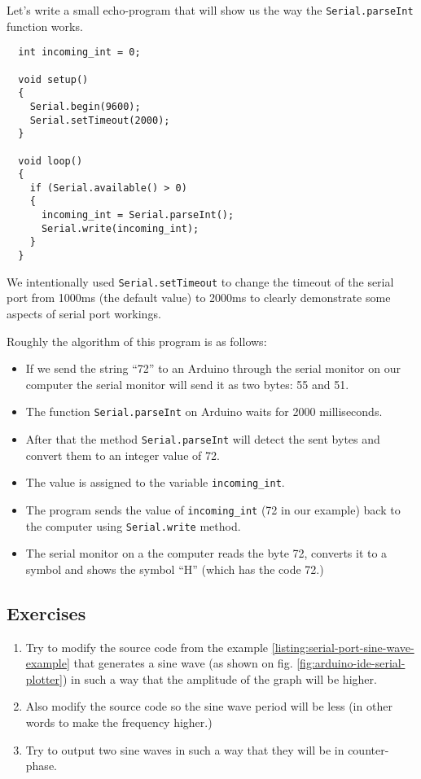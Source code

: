 \documentclass[../sparc.tex]{subfiles}
\begin{document}
Let's write a small echo-program that will show us the way the
\texttt{Serial.parseInt} function works.

\begin{verbatim}
  int incoming_int = 0;

  void setup()
  {
    Serial.begin(9600);
    Serial.setTimeout(2000);
  }

  void loop()
  {
    if (Serial.available() > 0)
    {
      incoming_int = Serial.parseInt();
      Serial.write(incoming_int);
    }
  }
\end{verbatim}

We intentionally used \texttt{Serial.setTimeout} to change the timeout of the
serial port from 1000ms (the default value) to 2000ms to clearly demonstrate
some aspects of serial port workings.

Roughly the algorithm of this program is as follows:
\begin{itemize}
\item If we send the string ``72'' to an Arduino through the serial monitor on
  our computer the serial monitor will send it as two bytes: 55 and 51.
\item The function \texttt{Serial.parseInt} on Arduino waits for 2000
  milliseconds.
\item After that the method \texttt{Serial.parseInt} will detect the sent bytes
  and convert them to an integer value of 72.
\item The value is assigned to the variable \texttt{incoming\_int}.
\item The program sends the value of \texttt{incoming\_int} (72 in our example)
  back to the computer using \texttt{Serial.write} method.
\item The serial monitor on a the computer reads the byte 72, converts it to a
  symbol and shows the symbol ``H'' (which has the code 72.)
\end{itemize}

\subsection{Exercises}

\begin{enumerate}
\item Try to modify the source code from the example
  \ref{listing:serial-port-sine-wave-example} that generates a sine wave (as
  shown on fig. \ref{fig:arduino-ide-serial-plotter}) in such a way that the amplitude of the graph will be higher.
\item Also modify the source code so the sine wave period will be less (in other
  words to make the frequency higher.)
\item Try to output two sine waves in such a way that they will be in
  counter-phase.
\end{enumerate}
\end{document}
